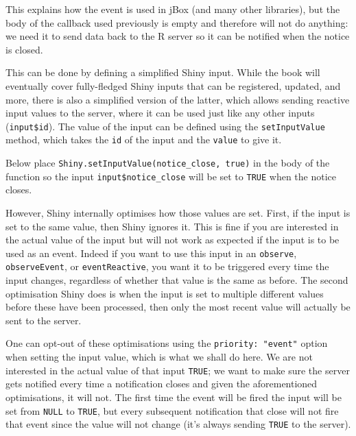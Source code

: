 \documentclass[10pt,]{krantz}
\makeatletter
\newenvironment{Shaded}{\begin{snugshade}}{\end{snugshade}}
\newcommand{\KeywordTok}[1]{\textcolor[rgb]{0.27,0.27,0.27}{\textbf{#1}}}
\newcommand{\NormalTok}[1]{#1}
\newcommand{\OperatorTok}[1]{\textcolor[rgb]{0.43,0.43,0.43}{\textbf{#1}}}
\newcommand{\StringTok}[1]{\textcolor[rgb]{0.5,0.5,0.5}{#1}}
\newenvironment{kframe}{%
\medskip{}
\setlength{\fboxsep}{.8em}
 \def\at@end@of@kframe{}%
 \ifinner\ifhmode%
  \def\at@end@of@kframe{\end{minipage}}%
  \begin{minipage}{\columnwidth}%
 \fi\fi%
 \def\FrameCommand##1{\hskip\@totalleftmargin \hskip-\fboxsep
 \colorbox{shadecolor}{##1}\hskip-\fboxsep
     \hskip-\linewidth \hskip-\@totalleftmargin \hskip\columnwidth}%
 \MakeFramed {\advance\hsize-\width
   \@totalleftmargin\z@ \linewidth\hsize
   \@setminipage}}%
 {\par\unskip\endMakeFramed%
 \at@end@of@kframe}
\renewenvironment{Shaded}{\begin{kframe}}{\end{kframe}}
\makeatother
\begin{document}
This explains how the event is used in jBox (and many other libraries), but the body of the callback used previously is empty and therefore will not do anything: we need it to send data back to the R server so it can be notified when the notice is closed.

This can be done by defining a simplified Shiny input. While the book will eventually cover fully-fledged Shiny inputs that can be registered, updated, and more, there is also a simplified version of the latter, which allows sending reactive input values to the server, where it can be used just like any other inputs (\texttt{input\$id}). The value of the input can be defined using the \texttt{setInputValue} method, which takes the \texttt{id} of the input and the \texttt{value} to give it.

Below place \texttt{Shiny.setInputValue(\textquotesingle{}notice\_close\textquotesingle{},\ true)} in the body of the function so the input \texttt{input\$notice\_close} will be set to \texttt{TRUE} when the notice closes.

\begin{Shaded}
\end{Shaded}

However, Shiny internally optimises how those values are set. First, if the input is set to the same value, then Shiny ignores it. This is fine if you are interested in the actual value of the input but will not work as expected if the input is to be used as an event. Indeed if you want to use this input in an \texttt{observe}, \texttt{observeEvent}, or \texttt{eventReactive}, you want it to be triggered every time the input changes, regardless of whether that value is the same as before. The second optimisation Shiny does is when the input is set to multiple different values before these have been processed, then only the most recent value will actually be sent to the server.

One can opt-out of these optimisations using the \texttt{priority:\ "event"} option when setting the input value, which is what we shall do here. We are not interested in the actual value of that input \texttt{TRUE}; we want to make sure the server gets notified every time a notification closes and given the aforementioned optimisations, it will not. The first time the event will be fired the input will be set from \texttt{NULL} to \texttt{TRUE}, but every subsequent notification that close will not fire that event since the value will not change (it's always sending \texttt{TRUE} to the server).
\end{document}
